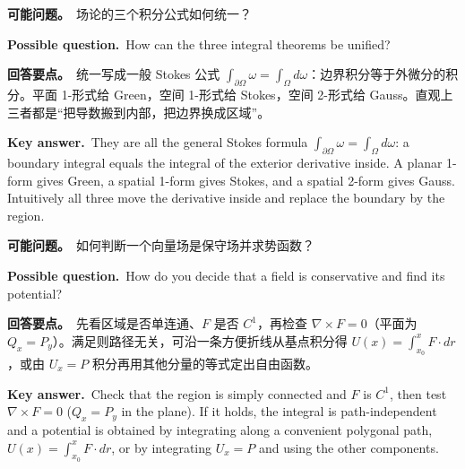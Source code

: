\documentclass[UTF8,11pt,a4paper]{ctexart}
\newcommand{\ASK}[4]{\begin{samepage}\par\noindent\textbf{可能问题。}\ #1\par\noindent\textbf{Possible question.}\ #2\par\noindent\textbf{回答要点。}\ #3\par\noindent\textbf{Key answer.}\ #4\medskip\end{samepage}}
\begin{document}
\ASK{场论的三个积分公式如何统一？}{How can the three integral theorems be unified?}{统一写成一般 Stokes 公式 $\int_{\partial\Omega}\omega=\int_\Omega d\omega$：边界积分等于外微分的积分。平面 1-形式给 Green，空间 1-形式给 Stokes，空间 2-形式给 Gauss。直观上三者都是“把导数搬到内部，把边界换成区域”。}{They are all the general Stokes formula $\int_{\partial\Omega}\omega=\int_\Omega d\omega$: a boundary integral equals the integral of the exterior derivative inside. A planar 1-form gives Green, a spatial 1-form gives Stokes, and a spatial 2-form gives Gauss. Intuitively all three move the derivative inside and replace the boundary by the region.}
\ASK{如何判断一个向量场是保守场并求势函数？}{How do you decide that a field is conservative and find its potential?}{先看区域是否单连通、$F$ 是否 $C^1$，再检查 $\nabla\times F=0$（平面为 $Q_x=P_y$）。满足则路径无关，可沿一条方便折线从基点积分得 $U(x)=\int_{x_0}^xF\cdot dr$，或由 $U_x=P$ 积分再用其他分量的等式定出自由函数。}{Check that the region is simply connected and $F$ is $C^1$, then test $\nabla\times F=0$ ($Q_x=P_y$ in the plane). If it holds, the integral is path-independent and a potential is obtained by integrating along a convenient polygonal path, $U(x)=\int_{x_0}^xF\cdot dr$, or by integrating $U_x=P$ and using the other components.}
\end{document}

